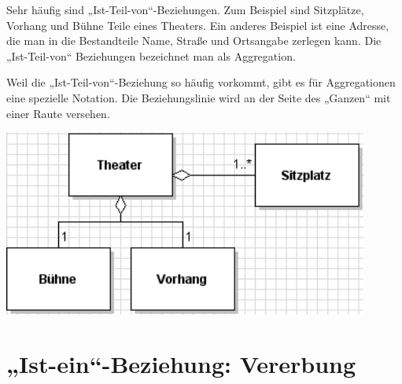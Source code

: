 \begin{minipage}{0.45\textwidth}
Sehr häufig sind „Ist-Teil-von“-Beziehungen.
Zum Beispiel sind Sitzplätze, Vorhang und
Bühne Teile eines Theaters. Ein anderes
Beispiel ist eine Adresse, die man in die
Bestandteile Name, Straße und Ortsangabe
zerlegen kann. Die „Ist-Teil-von“ Beziehungen
bezeichnet man als Aggregation.

Weil die „Ist-Teil-von“-Beziehung so häufig
vorkommt, gibt es für Aggregationen eine
spezielle Notation. Die Beziehungslinie wird an
der Seite des „Ganzen“ mit einer Raute
versehen.
\end{minipage}
\begin{minipage}{0.55\textwidth}
\begin{center}
\includegraphics[width=0.9\textwidth]{./inf/SEKII/15_UML_Klassendiagramme/Aggregationsbeziehung.png}
\end{center}
\end{minipage}


\section{„Ist-ein“-Beziehung: Vererbung}

